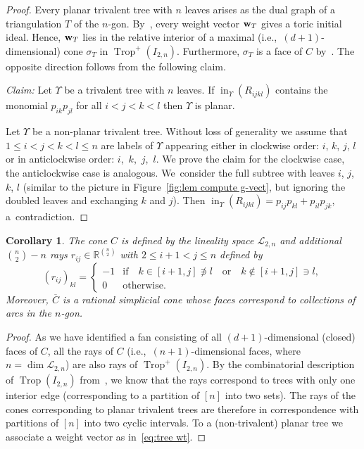 \documentclass[pdftex]{sigma}%
\newtheorem{Corollary}[Theorem]{Corollary}
\numberwithin{equation}{section}
\DeclareMathOperator{\init}{in}
\DeclareMathOperator{\trop}{Trop}
\begin{document}
\begin{proof}
Every planar trivalent tree with $n$ leaves arises as the dual graph of a triangulation $T$ of the $n$-gon.
By~, every weight vector ${\bf w}_T$ gives a toric initial ideal. Hence, ${\bf w}_T$ lies in the relative interior of a maximal (i.e.,~$(d+1)$-dimensional) cone $\sigma_T$ in $\trop^+(I_{2,n})$.
Furthermore, $\sigma_T$ is a face of $C$ by~.
The opposite direction follows from the following claim.

\medskip\noindent
{\it Claim:} Let $\Upsilon$ be a trivalent tree with $n$ leaves. If $\init_{{\Upsilon}}(R_{ijkl})$ contains the monomial $p_{ik}p_{jl}$ for
 all $i<j<k<l $ then $\Upsilon$ is planar.

\medskip

\noindent
Let $\Upsilon$ be a non-planar trivalent tree.
Without loss of generality we assume that $1\le i<j<k<l\le n$ are labels of $\Upsilon$ appearing either in clockwise order: $i$, $k$, $j$, $l$ or in anticlockwise order: $i$,~$k$,~$j$,~$l$.
We prove the claim for the clockwise case, the anticlockwise case is analogous.
We~consider the full subtree with leaves $i$, $j$, $k$, $l$ (similar to the picture in Figure~\ref{fig:lem compute g-vect}, but ignoring the doubled leaves and exchanging $k$ and $j$).
Then $\init_{{\Upsilon}}(R_{ijkl})=p_{ij}p_{kl}+p_{il}p_{jk}$, a~con\-tra\-diction.
\end{proof}


\begin{samepage}
\begin{Corollary}
The cone $C$ is defined by the lineality space $\mathcal L_{2,n}$ and additional $\binom{n}{2}-n$ rays $r_{ij}\in \mathbb R^{\binom{n}{2}}$ with $2\le i+1<j\le n$ defined by
\begin{displaymath}%
(r_{ij})_{kl}=\begin{cases}
-1 & \text{if}\quad k\in [i+1,j]\not\ni l\quad \text{or}\quad k\not\in [i+1,j]\ni l,
\\
0 & \text{otherwise}.
\end{cases}
\end{displaymath}
Moreover, $\overline{C}$ %
is a rational simplicial cone whose faces correspond to collections of arcs in the $n$-gon.
\end{Corollary}
\end{samepage}

\begin{proof}
As we have identified a fan consisting of all $(d+1)$-dimensional (closed) faces of $C$, all the rays of $C$ (i.e.,~$(n+1)$-dimensional faces, where $n=\dim\mathcal L_{2,n}$) are also rays of $\trop^+(I_{2,n})$.
By the combinatorial description of $\trop(I_{2,n})$ %
from~\cite{SS04}, we know that the rays correspond to trees with only one interior edge (corresponding to a partition of $[n]$ into two sets).
The rays of the cones corresponding to planar trivalent trees are therefore in correspondence with partitions of $[n]$ into two cyclic intervals.
To a (non-trivalent) planar tree we associate a weight vector as in~\eqref{eq:tree wt}.
\end{proof}
\end{document}
